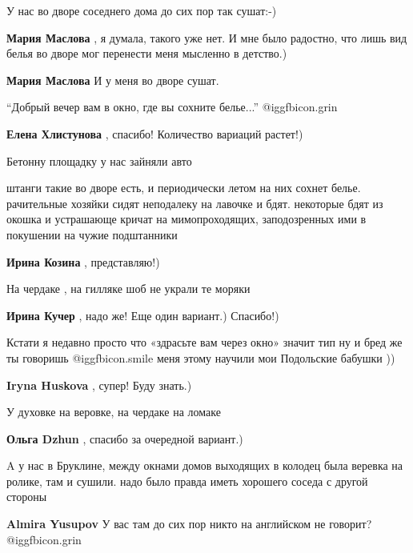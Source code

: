 \begin{itemize}
У нас во дворе соседнего дома до сих пор так сушат:-)

\begin{itemize} %
\textbf{Мария Маслова} , я думала, такого уже нет. И мне было радостно, что лишь вид белья во дворе мог перенести меня мысленно в детство.)

\textbf{Мария Маслова} И у меня во дворе сушат.

\end{itemize} %

\enquote{Добрый вечер вам в окно, где вы сохните белье...} @igg{fbicon.grin} 

\textbf{Елена Хлистунова} , спасибо! Количество вариаций растет!)

Бетонну площадку у нас зайняли авто


штанги такие во дворе есть, и периодически летом на них сохнет белье.
рачительные хозяйки сидят неподалеку на лавочке и бдят. некоторые бдят из
окошка и устрашающе кричат на мимопроходящих, заподозренных ими в покушении на
чужие подштанники

\textbf{Ирина Козина} , представляю!)

На чердаке , на гилляке шоб не украли те моряки

\textbf{Ирина Кучер} , надо же! Еще один вариант.) Спасибо!)


Кстати я недавно просто что «здрасьте вам через окно» значит тип ну и бред же
ты говоришь  @igg{fbicon.smile}  меня этому научили мои Подольские бабушки ))

\textbf{Iryna Huskova} , супер! Буду знать.)

У духовке на веровке, на чердаке на ломаке

\textbf{Ольга Dzhun} , спасибо за очередной вариант.)


A у нас в Бруклине, между окнами домов выходящих в колодец была веревка на
ролике, там и сушили. надо было правда иметь хорошего соседа с другой стороны

\begin{itemize} %
\textbf{Almira Yusupov} У вас там до сих пор никто на английском не говорит? @igg{fbicon.grin} 


\end{itemize}
\end{itemize}
